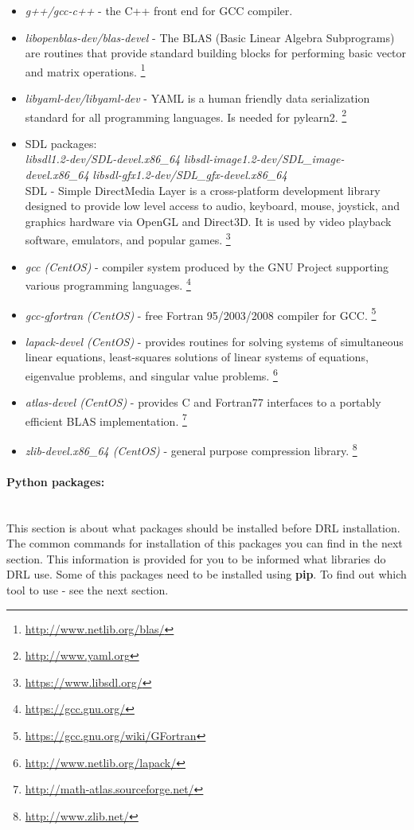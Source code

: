 \documentclass[a4paper,oneside,dvipsnames]{article}
\begin{document}
\begin{itemize}
  \item \textit{g++/gcc-c++} - the C++ front end for GCC compiler.
  \item \textit{libopenblas-dev/blas-devel} - The BLAS (Basic Linear Algebra Subprograms) are routines that provide standard building blocks for performing basic vector and matrix operations. 
    \footnote{\url{http://www.netlib.org/blas/}}
  \item \textit{libyaml-dev/libyaml-dev} - YAML is a human friendly data serialization standard for all programming languages. Is needed for pylearn2. 
    \footnote{\url{http://www.yaml.org}}
  \item SDL packages:
\\
\subitem \textit{libsdl1.2-dev/SDL-devel.x86\_64}
\subitem \textit{libsdl-image1.2-dev/SDL\_image-devel.x86\_64}
\subitem \textit{libsdl-gfx1.2-dev/SDL\_gfx-devel.x86\_64}
\\

    SDL - Simple DirectMedia Layer is a cross-platform development library designed to provide low level access to audio, keyboard, mouse, joystick, and graphics hardware via OpenGL and Direct3D. It is used by video playback software, emulators, and popular games. 
    \footnote{\url{https://www.libsdl.org/}}
  \item \textit{gcc (CentOS)} - compiler system produced by the GNU Project supporting various programming languages. 
    \footnote{\url{https://gcc.gnu.org/}}
  \item \textit{gcc-gfortran (CentOS)} - free Fortran 95/2003/2008 compiler for GCC. 
    \footnote{\url{https://gcc.gnu.org/wiki/GFortran}}
  \item \textit{lapack-devel (CentOS)} - provides routines for solving systems of simultaneous linear equations, least-squares solutions of linear systems of equations, eigenvalue problems, and singular value problems. 
    \footnote{\url{http://www.netlib.org/lapack/}}
  \item \textit{atlas-devel (CentOS)} - provides C and Fortran77 interfaces to a portably efficient BLAS implementation. 
    \footnote{\url{http://math-atlas.sourceforge.net/}}
  \item \textit{zlib-devel.x86\_64 (CentOS)} - general purpose compression library. 
    \footnote{\url{http://www.zlib.net/}}
\end{itemize}

\paragraph*{Python packages:}\mbox{}\\
This section is about what packages should be installed before DRL installation. The common commands for installation of this packages you can find in the next section. This information is provided for you to be informed what libraries do DRL use.
Some of this packages need to be installed using \textbf{pip}. To find out which tool to use - see the next section.
\end{document}

